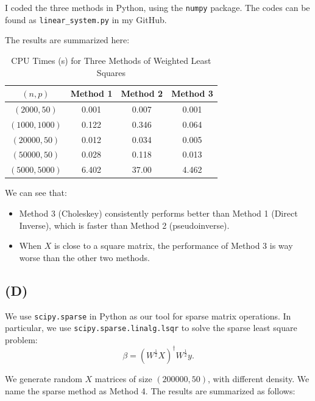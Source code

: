 \documentclass[a4paper,11pt]{article}
\begin{document}
I coded the three methods in Python, using the \texttt{numpy} package. The codes can be found as \texttt{linear\_system.py} in my GitHub.

The results are summarized here:

\begin{table}[!h]
\caption{CPU Times (s) for Three Methods of Weighted Least Squares}
\centering
\begin{tabular}{c c c c }
\firsthline
$(n,p)$&  Method 1 & Method 2 &Method 3  \\
\hline
$(2000,50)$& 0.001 & 0.007 & 0.001  \\
$(1000,1000)$ & 0.122 & 0.346 & 0.064  \\
$(20000,50)$ & 0.012 & 0.034 & 0.005  \\
$(50000,50)$ & 0.028& 0.118 & 0.013  \\
$(5000,5000)$ &  6.402 & 37.00 & 4.462\\
\hline
\end{tabular}
\end{table}

We can see that:
\begin{itemize}
	\item Method 3 (Choleskey) consistently performs better than Method 1 (Direct Inverse), which is faster than Method 2 (pseudoinverse). 
	\item When $X$ is close to a square matrix, the performance of Method 3 is way worse than the other two methods.
\end{itemize} 

\subsection{(D)}

We use \texttt{scipy.sparse} in Python as our tool for sparse matrix operations. In particular, we use \texttt{scipy.sparse.linalg.lsqr} to solve the sparse least square problem:
$$
\beta  = ({W}^{\frac{1}{2}}X)^\dagger {W}^{\frac{1}{2}} y.
$$

We generate random $X$ matrices of size $(200000,50)$, with different density. We name the sparse method as Method 4. The results are summarized as follows:
\end{document}
